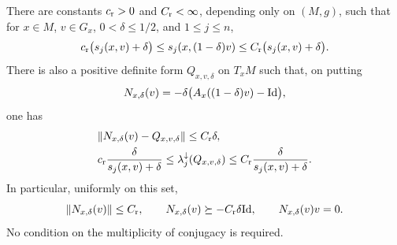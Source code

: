 \begin{lemma}\label{spec:radial}
There are constants $c_{\rm r}>0$ and $C_{\rm r}<\infty$, depending only
on $(M,g)$, such that for $x\in M$, $v\in G_x$, $0<\delta\le1/2$, and
$1\le j\le n$,
\begin{equation}\label{spec:singular-shortening}
  c_{\rm r}\bigl(s_j(x,v)+\delta\bigr)
   \le s_j(x,(1-\delta)v)
   \le C_{\rm r}\bigl(s_j(x,v)+\delta\bigr).
\end{equation}
There is also a positive definite form $Q_{x,v,\delta}$ on $T_xM$ such
that, on putting
\[
  N_{x,\delta}(v)
       =-\delta\bigl(A_x((1-\delta)v)-\mathrm{Id}\bigr),
\]
one has
\begin{align}
  &\|N_{x,\delta}(v)-Q_{x,v,\delta}\|\le C_{\rm r}\delta,
       \label{spec:bounded-background}\\
  &c_{\rm r}\frac{\delta}{s_j(x,v)+\delta}
     \le\lambda_j^{\downarrow}(Q_{x,v,\delta})
     \le C_{\rm r}\frac{\delta}{s_j(x,v)+\delta}.
       \label{spec:hessian-spectrum}
\end{align}
In particular, uniformly on this set,
\begin{equation}\label{spec:bounded-N}
  \|N_{x,\delta}(v)\|\le C_{\rm r},\qquad
  N_{x,\delta}(v)\succeq-C_{\rm r}\delta\mathrm{Id},
  \qquad N_{x,\delta}(v)v=0.
\end{equation}
No condition on the multiplicity of conjugacy is required.
\end{lemma}

